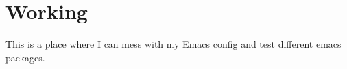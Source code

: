 \documentclass[12pt]{article}
\begin{document}
\section*{Working}

This is a place where I can mess with my Emacs config and test different emacs packages.
\end{document}
